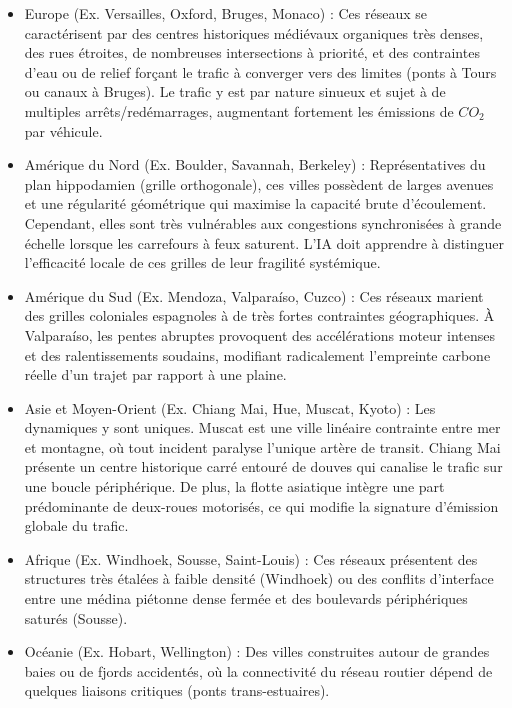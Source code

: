 \documentclass[10pt, a4paper]{article}
\providecommand{\tightlist}{}
\begin{document}
\begin{itemize}
\tightlist
\item
  Europe (Ex. Versailles, Oxford, Bruges, Monaco) : Ces réseaux se
  caractérisent par des centres historiques médiévaux organiques très
  denses, des rues étroites, de nombreuses intersections à priorité, et
  des contraintes d'eau ou de relief forçant le trafic à converger vers
  des limites (ponts à Tours ou canaux à Bruges). Le trafic y est par
  nature sinueux et sujet à de multiples arrêts/redémarrages, augmentant
  fortement les émissions de \(CO_2\) par véhicule.
\item
  Amérique du Nord (Ex. Boulder, Savannah, Berkeley) : Représentatives
  du plan hippodamien (grille orthogonale), ces villes possèdent de
  larges avenues et une régularité géométrique qui maximise la capacité
  brute d'écoulement. Cependant, elles sont très vulnérables aux
  congestions synchronisées à grande échelle lorsque les carrefours à
  feux saturent. L'IA doit apprendre à distinguer l'efficacité locale de
  ces grilles de leur fragilité systémique.
\item
  Amérique du Sud (Ex. Mendoza, Valparaíso, Cuzco) : Ces réseaux marient
  des grilles coloniales espagnoles à de très fortes contraintes
  géographiques. À Valparaíso, les pentes abruptes provoquent des
  accélérations moteur intenses et des ralentissements soudains,
  modifiant radicalement l'empreinte carbone réelle d'un trajet par
  rapport à une plaine.
\item
  Asie et Moyen-Orient (Ex. Chiang Mai, Hue, Muscat, Kyoto) : Les
  dynamiques y sont uniques. Muscat est une ville linéaire contrainte
  entre mer et montagne, où tout incident paralyse l'unique artère de
  transit. Chiang Mai présente un centre historique carré entouré de
  douves qui canalise le trafic sur une boucle périphérique. De plus, la
  flotte asiatique intègre une part prédominante de deux-roues
  motorisés, ce qui modifie la signature d'émission globale du trafic.
\item
  Afrique (Ex. Windhoek, Sousse, Saint-Louis) : Ces réseaux présentent
  des structures très étalées à faible densité (Windhoek) ou des
  conflits d'interface entre une médina piétonne dense fermée et des
  boulevards périphériques saturés (Sousse).
\item
  Océanie (Ex. Hobart, Wellington) : Des villes construites autour de
  grandes baies ou de fjords accidentés, où la connectivité du réseau
  routier dépend de quelques liaisons critiques (ponts trans-estuaires).
\end{itemize}
\end{document}

